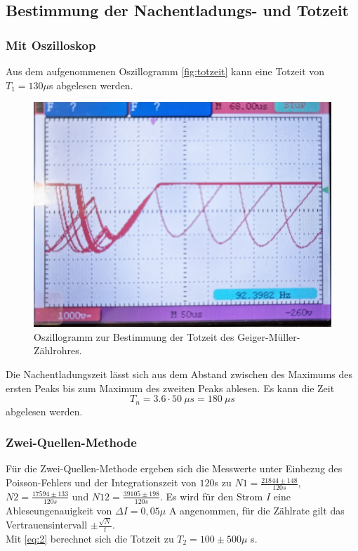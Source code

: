 \subsection{Bestimmung der Nachentladungs- und Totzeit}
\subsubsection{Mit Oszilloskop}
Aus dem aufgenommenen Oszillogramm \autoref{fig:totzeit} kann eine Totzeit von 
$T_1 = 130 \mu$s abgelesen werden.\\
\begin{figure}[H]
  \centering
  \includegraphics[width = \textwidth]{content/totzeit.jpg}
  \caption{Oszillogramm zur Bestimmung der Totzeit des Geiger-Müller-Zählrohres.}
  \label{fig:totzeit}
\end{figure}
Die Nachentladungszeit lässt sich aus dem Abstand zwischen des Maximums des ersten Peaks bis zum Maximum des zweiten Peaks ablesen. Es kann die Zeit
\begin{equation*}
  T_n=3.6\cdot 50\ \mu s=180\ \mu s
\end{equation*}
abgelesen werden. 

\subsubsection{Zwei-Quellen-Methode}
 Für die Zwei-Quellen-Methode ergeben sich die Messwerte unter Einbezug des 
 Poisson-Fehlers und der Integrationszeit von $120$s zu $N1 = \frac{21844 \pm 148}{120s}$, $N2 = \frac{17594 \pm 133}{120s}$ 
 und $N12 = \frac{39105 \pm 198}{120s}$.
 Es wird für den Strom $I$ eine Ableseungenauigkeit von $\Delta I = 0,05 \mu$ A angenommen, für die Zählrate 
 gilt das Vertrauensintervall $\pm \frac{\sqrt{N}}{t}$.\\
 Mit \autoref{eq:2} berechnet sich die Totzeit zu $T_2 = 100 \pm 500 \mu$ s.




